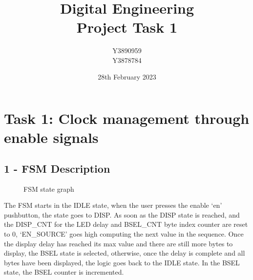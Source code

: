 \documentclass[11pt]{report}
\title{Digital Engineering\\Project Task 1}
\author{Y3890959\\Y3878784}
\date{28th February 2023}
\begin{document}
\maketitle

\chapter*{Task 1: Clock management through enable signals}

\section*{1 - FSM Description}

\begin{figure}[ht] %
    \centering %
    \caption{FSM state graph}
    \label{fig:my_label}
\end{figure}
    
The FSM starts in the IDLE state, when the user presses the enable `en' pushbutton,
the state goes to DISP. As soon as the DISP state is reached, and the
DISP\_CNT for the LED delay and BSEL\_CNT byte index counter are reset
to 0, `EN\_SOURCE' goes high computing the next value in the sequence. Once the display
delay has reached its max value and there are still more bytes to display, the BSEL state
is selected, otherwise, once the delay is complete and all bytes have been displayed, the
logic goes back to the IDLE state. In the BSEL state, the BSEL counter is incremented.
\end{document}
